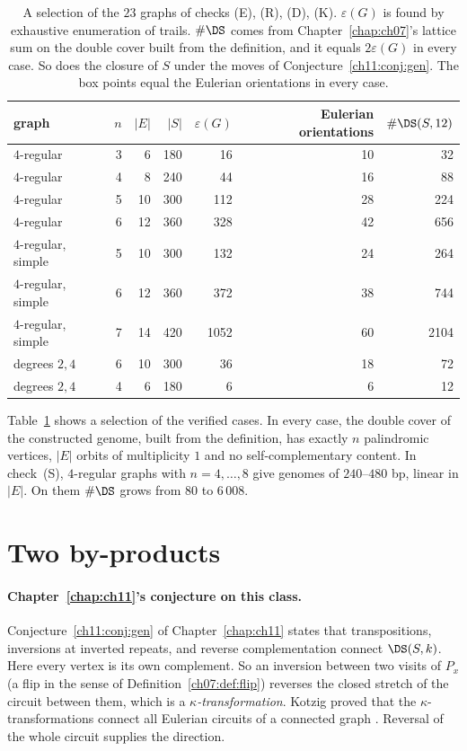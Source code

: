 \begin{table}[t]
\centering\small
\begin{tabular}{lrrrrrr}
\toprule
graph & $n$ & $|E|$ & $|S|$ & $\varepsilon(G)$ & Eulerian orientations & $\#\DS(S,12)$\\
\midrule
$4$-regular & 3 & 6 & 180 & 16 & 10 & 32\\
$4$-regular & 4 & 8 & 240 & 44 & 16 & 88\\
$4$-regular & 5 & 10 & 300 & 112 & 28 & 224\\
$4$-regular & 6 & 12 & 360 & 328 & 42 & 656\\
$4$-regular, simple & 5 & 10 & 300 & 132 & 24 & 264\\
$4$-regular, simple & 6 & 12 & 360 & 372 & 38 & 744\\
$4$-regular, simple & 7 & 14 & 420 & 1052 & 60 & 2104\\
degrees $2,4$ & 6 & 10 & 300 & 36 & 18 & 72\\
degrees $2,4$ & 4 & 6 & 180 & 6 & 6 & 12\\
\bottomrule
\end{tabular}
\caption{A selection of the $23$ graphs of checks (E), (R), (D), (K). $\varepsilon(G)$ is found by exhaustive
enumeration of trails. $\#\DS$ comes from Chapter~\ref{chap:ch07}'s lattice sum on the double cover built from the
definition, and it equals $2\varepsilon(G)$ in every case. So does the closure of $S$ under the
moves of Conjecture~\ref{ch11:conj:gen}. The box points equal the Eulerian orientations in every case.}\label{ch10:tab:res}
\end{table}

Table~\ref{ch10:tab:res} shows a selection of the verified cases. In every case, the double cover of the
constructed genome, built from the definition, has exactly $n$ palindromic vertices, $|E|$ orbits of
multiplicity $1$ and no self-complementary content. In check~(S), $4$-regular graphs with $n=4,\dots,8$
give genomes of $240$--$480$ bp, linear in $|E|$. On them $\#\DS$ grows from $80$ to $6\,008$.

\section{Two by-products}\label{ch10:sec:by}

\paragraph{Chapter~\ref{chap:ch11}'s conjecture on this class.} Conjecture~\ref{ch11:conj:gen} of Chapter~\ref{chap:ch11} states that transpositions, inversions
at inverted repeats, and reverse complementation connect $\DS(S,k)$. Here every vertex is its
own complement. So an inversion between two visits of $P_x$ (a flip in the sense of
Definition~\ref{ch07:def:flip}) reverses the closed stretch of the circuit between them, which is a
\emph{$\kappa$-transformation}. Kotzig proved that the $\kappa$-transformations
connect all Eulerian circuits of a connected graph \cite{Kot68,Fle90}. Reversal of the whole circuit
supplies the direction.

